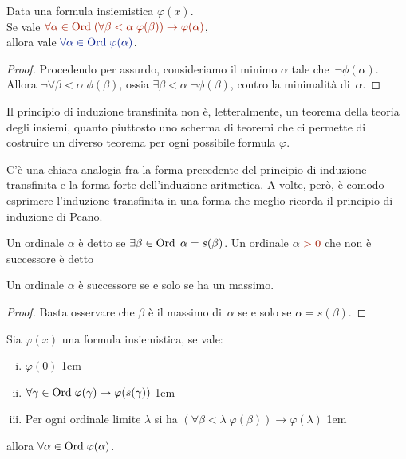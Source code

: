 \begin{proposition}
	\label{induz_transf1}
	Data una formula insiemistica $\varphi(x)$.\\
 Se vale $\drkred \forall {\alpha \in \Ord} \;(\forall {\beta < \alpha} \;
\varphi(\beta)) \rightarrow \varphi(\alpha)$,\\
allora vale $\drkblu \forall {\alpha \in \Ord} \; \varphi(\alpha)$.
\end{proposition}

\begin{proof}
	Procedendo per assurdo, consideriamo il minimo $\alpha$ tale
che~$\neg\phi(\alpha)$. Allora $\neg \forall {\beta < \alpha} \;
\phi(\beta)$, ossia $\exists {\beta < \alpha}\; \neg\phi(\beta)$, contro la
minimalit\`a di~$\alpha$.
\end{proof}

\begin{note}
	Il principio di induzione transfinita non \`e, letteralmente, un
teorema della teoria degli insiemi, quanto piuttosto uno scherma di
teoremi che ci permette 
	di costruire un diverso teorema per ogni possibile formula
$\varphi$.
\end{note}

C'\`e una chiara analogia fra la forma precedente del principio di induzione transfinita e la forma forte dell'induzione aritmetica.
A volte, per\`o, \`e comodo esprimere l'induzione transfinita in una forma che meglio ricorda il principio di induzione di Peano.

\begin{definition}
Un ordinale $\alpha$ \`e detto 
se $\exists \begingroup\beta \in \Ord\endgroup \; \alpha = s(\beta)$. Un ordinale
$\alpha\;{\drkred > 0}$ che non \`e successore \`e detto 
\end{definition}

\begin{remark}
	Un ordinale $\alpha$ \`e successore se e solo se ha un massimo.
\end{remark}

\begin{proof}
	Basta osservare che $\beta$ \`e il massimo di~$\alpha$ se e solo
se $\alpha = s(\beta)$.
\end{proof}

\begin{proposition}
	\label{induz_transf2}
	Sia $\varphi(x)$ una formula insiemistica, se vale:
	\begin{enumerate}[(i)]
		\item $\varphi(0)$ \kern1em
		\item $\forall {\gamma \in \operatorname{Ord}} \; \varphi(\gamma)
\rightarrow \varphi(s(\gamma))$ \kern1em
		\item Per ogni ordinale limite $\lambda$ si ha $(\forall
{\beta < \lambda} \; \varphi(\beta)) \rightarrow \varphi(\lambda)$ \kern1em
	\end{enumerate}
	allora $\forall {\alpha \in \operatorname{Ord}} \; \varphi(\alpha)$.
\end{proposition}


